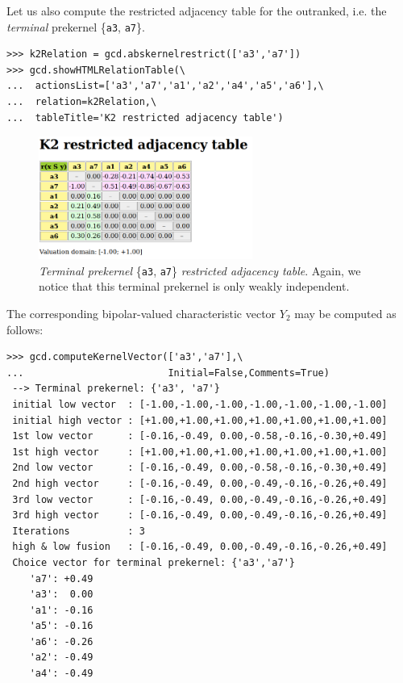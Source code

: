 Let us also compute the restricted adjacency table for the outranked, i.e. the \emph{terminal} prekernel \{\texttt{a3}, \texttt{a7}\}.
\begin{lstlisting}
>>> k2Relation = gcd.abskernelrestrict(['a3','a7'])
>>> gcd.showHTMLRelationTable(\
...  actionsList=['a3','a7','a1','a2','a4','a5','a6'],\
...  relation=k2Relation,\
...  tableTitle='K2 restricted adjacency table')
\end{lstlisting}
\begin{figure}[ht]
\sidecaption[t]
\includegraphics[width=7cm]{Figures/17-11-k2restricted.png}
\caption[Terminal prekernel \{\texttt{a3}, \texttt{a7}\} restricted adjacency table]{\emph{Terminal prekernel} \{\texttt{a3}, \texttt{a7}\} \emph{restricted adjacency table}. Again, we notice that this terminal prekernel is only weakly independent.}
\label{fig:17.11}       %
\end{figure}

The corresponding bipolar-valued characteristic vector $Y_2$ may be computed as follows:
\begin{lstlisting}[basicstyle=\ttfamily\scriptsize]
>>> gcd.computeKernelVector(['a3','a7'],\
...                         Initial=False,Comments=True)
 --> Terminal prekernel: {'a3', 'a7'}
 initial low vector  : [-1.00,-1.00,-1.00,-1.00,-1.00,-1.00,-1.00]
 initial high vector : [+1.00,+1.00,+1.00,+1.00,+1.00,+1.00,+1.00]
 1st low vector      : [-0.16,-0.49, 0.00,-0.58,-0.16,-0.30,+0.49]
 1st high vector     : [+1.00,+1.00,+1.00,+1.00,+1.00,+1.00,+1.00]
 2nd low vector      : [-0.16,-0.49, 0.00,-0.58,-0.16,-0.30,+0.49]
 2nd high vector     : [-0.16,-0.49, 0.00,-0.49,-0.16,-0.26,+0.49]
 3rd low vector      : [-0.16,-0.49, 0.00,-0.49,-0.16,-0.26,+0.49]
 3rd high vector     : [-0.16,-0.49, 0.00,-0.49,-0.16,-0.26,+0.49]
 Iterations          : 3
 high & low fusion   : [-0.16,-0.49, 0.00,-0.49,-0.16,-0.26,+0.49]
 Choice vector for terminal prekernel: {'a3','a7'}
    'a7': +0.49
    'a3':  0.00
    'a1': -0.16
    'a5': -0.16
    'a6': -0.26
    'a2': -0.49
    'a4': -0.49
\end{lstlisting}


